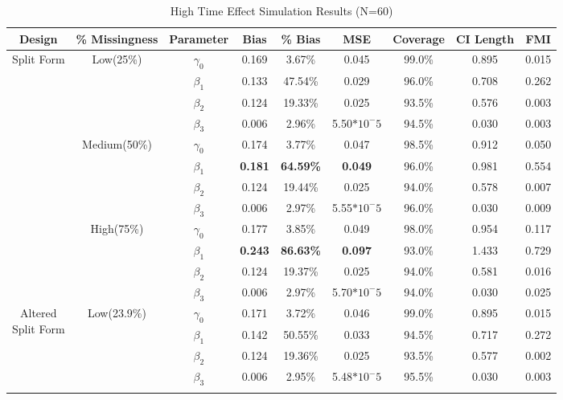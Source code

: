 \documentclass{svjour3}                     %
\begin{document}
\begin{table}[p]
	\centering
	\caption{High Time Effect Simulation Results (N=60)}
	\label{tab:table6}
	\setlength{\tabcolsep}{0.1cm}
	\hspace*{-1cm}
	\begin{tabular}{c|c|c|cccccc}
		\toprule
		Design & \% Missingness & Parameter & Bias & \% Bias & MSE & Coverage & CI Length & FMI \\
		\midrule
		\multirow{12}{*}{Split Form}
		& \multirow{4}{*}{Low(25\%)}
		& $\gamma_0$ & 0.169 & 3.67\% & 0.045 & 99.0\% & 0.895 & 0.015 \\
		&& $\beta_1$ & 0.133 & 47.54\% & 0.029 & 96.0\% & 0.708 & 0.262 \\
		&& $\beta_2$ & 0.124 & 19.33\% & 0.025 & 93.5\% & 0.576 & 0.003 \\
		&& $\beta_3$ & 0.006 & 2.96\% & 5.50$*10^-5$ & 94.5\% & 0.030 & 0.003 \\ \cline{2-9} \noalign{\smallskip}
		&\multirow{4}{*}{Medium(50\%)}
		& $\gamma_0$ & 0.174 & 3.77\% & 0.047 & 98.5\% & 0.912 & 0.050 \\
		&& $\beta_1$ & \textbf{0.181} & \textbf{64.59\%} & \textbf{0.049} & 96.0\% & 0.981 & 0.554 \\
		&& $\beta_2$ & 0.124 & 19.44\% & 0.025 & 94.0\% & 0.578 & 0.007 \\
		&& $\beta_3$ & 0.006 & 2.97\% & 5.55$*10^-5$ & 96.0\% & 0.030 & 0.009 \\ \cline{2-9} \noalign{\smallskip}
		& \multirow{4}{*}{High(75\%)}
		& $\gamma_0$ & 0.177 & 3.85\% & 0.049 & 98.0\% & 0.954 & 0.117 \\
		&& $\beta_1$ & \textbf{0.243} & \textbf{86.63\%} & \textbf{0.097} & 93.0\% & 1.433 & 0.729 \\
		&& $\beta_2$ & 0.124 & 19.37\% & 0.025 & 94.0\% & 0.581 & 0.016 \\
		&& $\beta_3$ & 0.006 & 2.97\% & 5.70$*10^-5$ & 94.0\% & 0.030 & 0.025 \\
		\midrule
		\midrule
		\multirow{12}{*}{\parbox{1.75cm}{Altered \\ Split Form}}
		& \multirow{4}{*}{Low(23.9\%)}
		& $\gamma_0$ & 0.171 & 3.72\% & 0.046 & 99.0\% & 0.895 & 0.015 \\
		&& $\beta_1$ & 0.142 & 50.55\% & 0.033 & 94.5\% & 0.717 & 0.272 \\
		&& $\beta_2$ & 0.124 & 19.36\% & 0.025 & 93.5\% & 0.577 & 0.002 \\
		&& $\beta_3$ & 0.006 & 2.95\% & 5.48$*10^-5$ & 95.5\% & 0.030 & 0.003 \\ \cline{2-9} \noalign{\smallskip}

\end{tabular}
\end{table}
\end{document}
